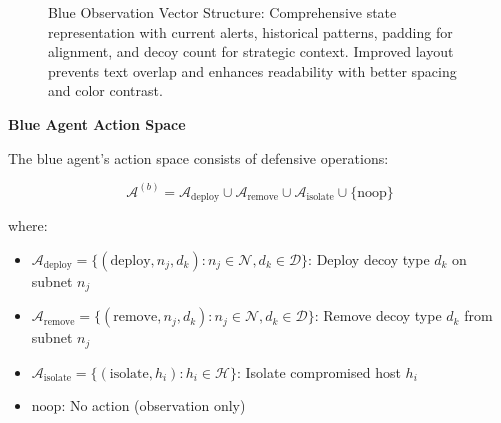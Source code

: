 \documentclass[12pt,oneside]{article}
\begin{document}
\begin{figure}[htbp]
\caption{Blue Observation Vector Structure: Comprehensive state representation with current alerts, historical patterns, padding for alignment, and decoy count for strategic context. Improved layout prevents text overlap and enhances readability with better spacing and color contrast.}
\label{fig:observation_vector}
\end{figure}

\textbf{Blue Agent Action Space}

The blue agent's action space consists of defensive operations:

\begin{equation}
\mathcal{A}^{(b)} = \mathcal{A}_{\text{deploy}} \cup \mathcal{A}_{\text{remove}} \cup \mathcal{A}_{\text{isolate}} \cup \{\text{noop}\}
\end{equation}

where:
\begin{itemize}
    \item $\mathcal{A}_{\text{deploy}} = \{(\text{deploy}, n_j, d_k) : n_j \in \mathcal{N}, d_k \in \mathcal{D}\}$: Deploy decoy type $d_k$ on subnet $n_j$
    \item $\mathcal{A}_{\text{remove}} = \{(\text{remove}, n_j, d_k) : n_j \in \mathcal{N}, d_k \in \mathcal{D}\}$: Remove decoy type $d_k$ from subnet $n_j$
    \item $\mathcal{A}_{\text{isolate}} = \{(\text{isolate}, h_i) : h_i \in \mathcal{H}\}$: Isolate compromised host $h_i$
    \item $\text{noop}$: No action (observation only)
\end{itemize}
\end{document}
